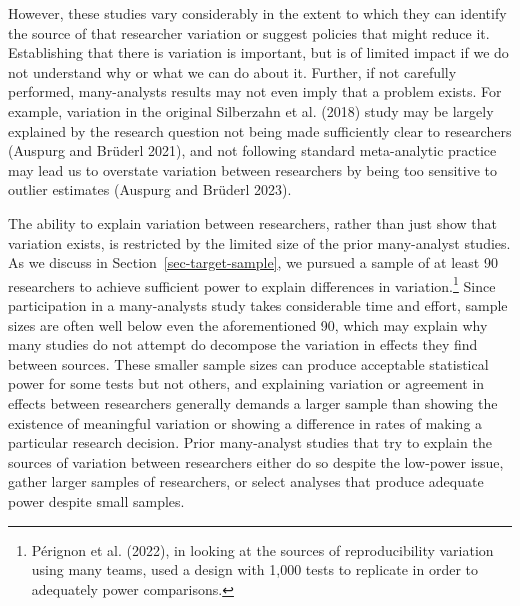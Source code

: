 \documentclass[
  letterpaper,
  DIV=11,
  numbers=noendperiod]{scrartcl}
\begin{document}
However, these studies vary considerably in the extent to which they can
identify the source of that researcher variation or suggest policies
that might reduce it. Establishing that there is variation is important,
but is of limited impact if we do not understand why or what we can do
about it. Further, if not carefully performed, many-analysts results may
not even imply that a problem exists. For example, variation in the
original Silberzahn et al. (2018) study may be largely explained by the
research question not being made sufficiently clear to researchers
(Auspurg and Brüderl 2021), and not following standard meta-analytic
practice may lead us to overstate variation between researchers by being
too sensitive to outlier estimates (Auspurg and Brüderl 2023).

The ability to explain variation between researchers, rather than just
show that variation exists, is restricted by the limited size of the
prior many-analyst studies. As we discuss in
Section~\ref{sec-target-sample}, we pursued a sample of at least 90
researchers to achieve sufficient power to explain differences in
variation.\footnote{Pérignon et al. (2022), in looking at the sources of
  reproducibility variation using many teams, used a design with 1,000
  tests to replicate in order to adequately power comparisons.} Since
participation in a many-analysts study takes considerable time and
effort, sample sizes are often well below even the aforementioned 90,
which may explain why many studies do not attempt do decompose the
variation in effects they find between sources. These smaller sample
sizes can produce acceptable statistical power for some tests but not
others, and explaining variation or agreement in effects between
researchers generally demands a larger sample than showing the existence
of meaningful variation or showing a difference in rates of making a
particular research decision. Prior many-analyst studies that try to
explain the sources of variation between researchers either do so
despite the low-power issue, gather larger samples of researchers, or
select analyses that produce adequate power despite small samples.
\end{document}

